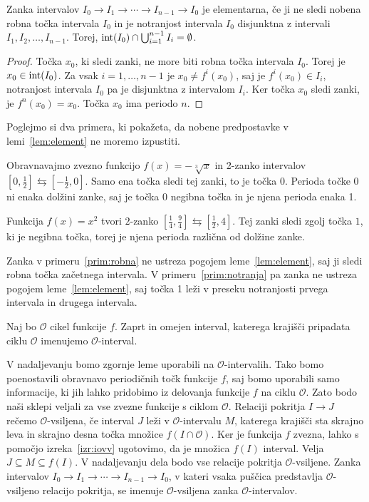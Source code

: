 \documentclass[../TG_magistrsko_delo_sections.tex]{subfiles}
\begin{document}
\begin{lema}\label{lem:element}
Zanka intervalov $I_0 \to I_1 \to \cdots \to I_{n-1} \to I_0$ je elementarna, če ji ne sledi nobena robna točka intervala $I_0$ in je notranjost intervala $I_0$ disjunktna z intervali $I_1, I_2,  \dots, I_{n-1}$. Torej, $\operatorname{int}(I_0) \cap \bigcup_{i=1}^{n-1}I_i = \emptyset$.
\end{lema}
\begin{proof}
Točka $x_0$, ki sledi zanki, ne more biti robna točka intervala $I_0$. Torej je $x_0 \in \operatorname{int}(I_0)$. Za vsak $i=1, \dots, n-1$ je $x_0 \neq f^i(x_0)$, saj je $f^i(x_0) \in I_i$, notranjost intervala $I_0$ pa je disjunktna z intervalom $I_i$. Ker točka $x_0$ sledi zanki, je $f^n(x_0)=x_0$. Točka $x_0$ ima periodo $n$.
\end{proof}

Poglejmo si dva primera, ki pokažeta, da nobene predpostavke v lemi~\ref{lem:element} ne moremo izpustiti.

\begin{primer}\label{prim:robna}
Obravnavajmo zvezno funkcijo $f(x) = -\sqrt[3]{x}$ in 2-zanko intervalov $\left[0, \frac{1}{2}\right] \leftrightarrows \left[-\frac{1}{2}, 0\right]$. Samo ena točka sledi tej zanki, to je točka 0. Perioda točke 0 ni enaka dolžini zanke, saj je točka 0 negibna točka in je njena perioda enaka 1.
\end{primer}
\begin{primer}\label{prim:notranja}
Funkcija $f(x) = x^2$ tvori $2$-zanko $\left[\frac{1}{4}, \frac{9}{4}\right] \leftrightarrows \left[\frac{1}{2}, 4\right]$. Tej zanki sledi zgolj točka $1$, ki je negibna točka, torej je njena perioda različna od dolžine zanke.
\end{primer}
Zanka v primeru~\ref{prim:robna} ne ustreza pogojem leme~\ref{lem:element}, saj ji sledi robna točka začetnega intervala. V primeru~\ref{prim:notranja} pa zanka ne ustreza pogojem leme~\ref{lem:element}, saj točka 1 leži v preseku notranjosti prvega intervala in drugega intervala. 

\begin{definicija}
Naj bo $\mathcal{O}$ cikel funkcije $f$. Zaprt in omejen interval, katerega krajišči pripadata ciklu $\mathcal{O}$ imenujemo $\mathcal{O}$-interval. 
\end{definicija}
V nadaljevanju bomo zgornje leme uporabili na $\mathcal{O}$-intervalih. Tako bomo poenostavili obravnavo periodičnih točk funkcije $f$, saj bomo uporabili samo informacije, ki jih lahko pridobimo iz delovanja funkcije $f$ na ciklu $\mathcal{O}$. Zato bodo naši sklepi veljali za vse zvezne funkcije s ciklom $\mathcal{O}$. Relaciji pokritja $I \to J$ rečemo $\mathcal{O}$-vsiljena, če interval $J$ leži v $\mathcal{O}$-intervalu $M$, katerega krajišči sta skrajno leva in skrajno desna točka množice $f(I \cap \mathcal{O})$. Ker je funkcija $f$ zvezna, lahko s pomočjo izreka~\ref{izr:iovv} ugotovimo, da je množica $f(I)$ interval. Velja $J \subseteq M \subseteq f(I)$. V nadaljevanju dela bodo vse relacije pokritja $\mathcal{O}$-vsiljene. Zanka intervalov $I_0 \to I_1 \to \cdots \to I_{n-1} \to I_0$, v kateri vsaka puščica predstavlja $\mathcal{O}$-vsiljeno relacijo pokritja, se imenuje $\mathcal{O}$-vsiljena zanka $\mathcal{O}$-intervalov.
\end{document}
